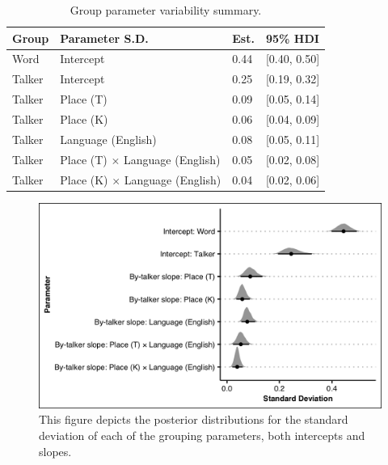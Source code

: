 \begin{table}[htbp]
  \caption{Group parameter variability summary.}
    \label{ch4:tab:grppar}
    \centering 
    \footnotesize
    \begin{tabular}{llll}
    \toprule
    \textbf{Group}  &\textbf{Parameter S.D.} & \textbf{Est.} &  \textbf{95\% HDI} \\
    \midrule
    Word    & Intercept                             & 0.44 & [0.40, 0.50] \\
    \midrule
    Talker  & Intercept                             & 0.25 & [0.19, 0.32] \\
    Talker  & Place (T)                             & 0.09 & [0.05, 0.14] \\
    Talker  & Place (K)                             & 0.06 & [0.04, 0.09] \\
    Talker  & Language (English)                    & 0.08 & [0.05, 0.11] \\
    Talker  & Place (T) $\times$ Language (English) & 0.05 & [0.02, 0.08] \\
    Talker  & Place (K) $\times$ Language (English) & 0.04 & [0.02, 0.06] \\
    \bottomrule
    \end{tabular}
\end{table}

\begin{figure}[htbp]
  \begin{center}
  \includegraphics[width=\linewidth]{figures/ch4_grppar_5in.png} 
  \caption{This figure depicts the posterior distributions for the standard deviation of each of the grouping parameters, both intercepts and slopes.}
  \label{ch4:fig:grppar}
  \end{center}
\end{figure}

